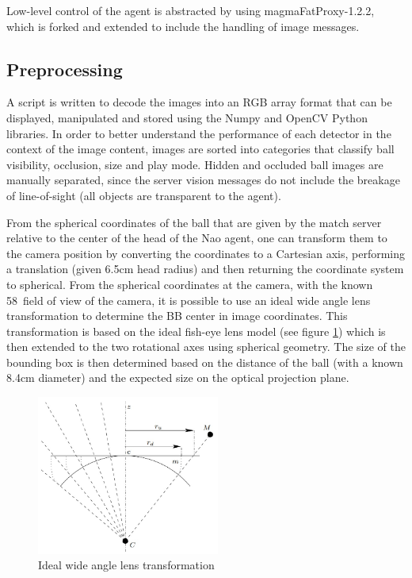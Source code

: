\documentclass[a4paper,twoside,12pt]{report}
\begin{document}
Low-level control of the agent is abstracted by using magmaFatProxy-1.2.2, which is forked and extended to include the handling of image messages.

\subsection{Preprocessing}

A script is written to decode the images into an RGB array format that can be displayed, manipulated and stored using the Numpy and OpenCV Python libraries. In order to better understand the performance of each detector in the context of the image content, images are sorted into categories that classify ball visibility, occlusion, size and play mode. Hidden and occluded ball images are manually separated, since the server vision messages do not include the breakage of line-of-sight (all objects are transparent to the agent).

From the spherical coordinates of the ball that are given by the match server relative to the center of the head of the Nao agent, one can transform them to the camera position by converting the coordinates to a Cartesian axis, performing a translation (given 6.5cm head radius) and then returning the coordinate system to spherical. From the spherical coordinates at the camera, with the known 58\textdegree\ field of view of the camera, it is possible to use an ideal wide angle lens transformation to determine the BB center in image coordinates. This transformation is based on the ideal fish-eye lens model (see figure \ref{fig:wideangle}) which is then extended to the two rotational axes using spherical geometry. The size of the bounding box is then determined based on the distance of the ball (with a known 8.4cm diameter) and the expected size on the optical projection plane.

\begin{figure}[h!]
\begin{center}
\includegraphics[width=6cm]{images/FOVmodel.jpg}
\caption{Ideal wide angle lens transformation \citep{wideangle} }
\label{fig:wideangle}
\end{center}
\end{figure}
\end{document}
